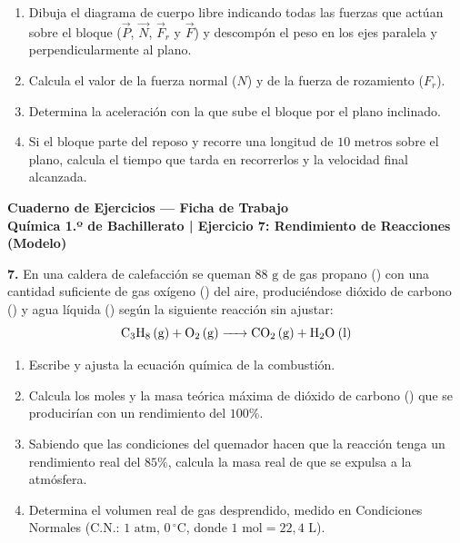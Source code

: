 ﻿\documentclass[11pt,a4paper]{article}
\begin{document}
\begin{enumerate}[label=\textbf{\alph*)}, leftmargin=2em, itemsep=7pt]
    \item Dibuja el diagrama de cuerpo libre indicando todas las fuerzas que actúan sobre el bloque ($\vec{P}$, $\vec{N}$, $\vec{F}_r$ y $\vec{F}$) y descompón el peso en los ejes paralela y perpendicularmente al plano.
    \item Calcula el valor de la fuerza normal ($N$) y de la fuerza de rozamiento ($F_r$).
    \item Determina la aceleración con la que sube el bloque por el plano inclinado.
    \item Si el bloque parte del reposo y recorre una longitud de $10\text{ metros}$ sobre el plano, calcula el tiempo que tarda en recorrerlos y la velocidad final alcanzada.
\end{enumerate}

\newpage

\begin{center}
    {\LARGE \textbf{Cuaderno de Ejercicios — Ficha de Trabajo}}\\[4pt]
    {\large \textbf{Química 1.º de Bachillerato | Ejercicio 7: Rendimiento de Reacciones (Modelo)}}
\end{center}

\vspace{0.8cm}
\noindent\textbf{7.} En una caldera de calefacción se queman $88\text{ g}$ de gas propano () con una cantidad suficiente de gas oxígeno () del aire, produciéndose dióxido de carbono () y agua líquida () según la siguiente reacción sin ajustar:
\[
\ce{C3H8 (g) + O2 (g) -> CO2 (g) + H2O (l)}
\]

\begin{enumerate}[label=\textbf{\alph*)}, leftmargin=2em, itemsep=12pt]
    \item Escribe y ajusta la ecuación química de la combustión.
    \item Calcula los moles y la masa teórica máxima de dióxido de carbono () que se producirían con un rendimiento del $100\%$.
    \item Sabiendo que las condiciones del quemador hacen que la reacción tenga un rendimiento real del $85\%$, calcula la masa real de  que se expulsa a la atmósfera.
    \item Determina el volumen real de gas  desprendido, medido en Condiciones Normales ($\text{C.N.}$: $1\text{ atm}$, $0\,^\circ\text{C}$, donde $1\text{ mol} = 22{,}4\text{ L}$).
\end{enumerate}
\end{document}
